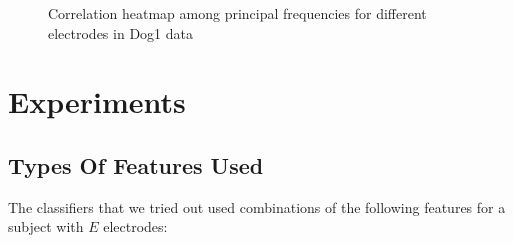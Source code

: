 \documentclass[a4paper]{article}
\begin{document}
\begin{figure}[H]
	\centering
	\qquad
	\caption{Correlation heatmap among principal frequencies for different electrodes in Dog1 data}
	\label{d1freqcorr}
\end{figure}

\section{Experiments}

\subsection{Types Of Features Used}

The classifiers that we tried out used combinations of the following features for a subject with $E$ electrodes:
\end{document}
